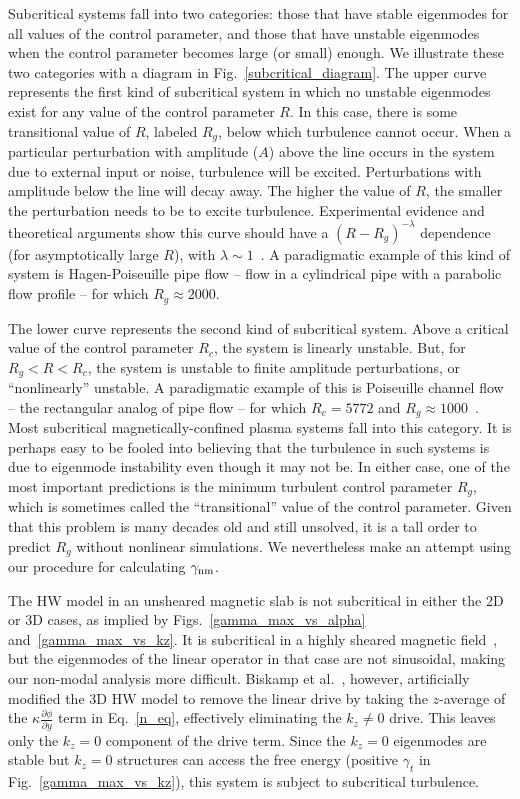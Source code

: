 \documentclass[twocolumn,showkeys,superscriptaddress]{revtex4}
\newcommand{\pdiff}[2]{\frac{\partial#1}{\partial#2}}
\begin{document}
Subcritical systems fall into two categories: those that have stable eigenmodes for all values of the control parameter, and those that have unstable eigenmodes
when the control parameter becomes large (or small) enough. We illustrate these two categories with a diagram in Fig.~\ref{subcritical_diagram}. 
The upper curve represents the first kind of subcritical system in which no unstable eigenmodes exist for any value of the control parameter $R$. In this
case, there is some transitional value of $R$, labeled $R_g$, below
which turbulence cannot occur. When a particular perturbation with amplitude ($A$) above the line occurs in the system due to external input or noise, turbulence will be excited. 
Perturbations with amplitude below the line will decay away. The higher the value of $R$, the smaller the perturbation needs to be to excite turbulence.
Experimental evidence and theoretical arguments show this curve should have a $(R-R_g)^{-\lambda}$ dependence (for asymptotically large $R$), with $\lambda \sim 1$~\cite{waleffe1995b,grossmann2000,hof2003}.
A paradigmatic example of this kind of system is Hagen-Poiseuille pipe flow -- flow in a cylindrical pipe with a parabolic flow profile -- for which $R_g \approx 2000$.

The lower curve represents the second kind of subcritical system. Above a critical value of the control parameter $R_c$, the system is linearly unstable. But, for $R_g < R < R_c$, the system is
unstable to finite amplitude perturbations, or ``nonlinearly'' unstable. A paradigmatic example of this is Poiseuille channel flow -- the rectangular analog of pipe flow -- for which
$R_c = 5772$ and $R_g \approx 1000$~\cite{grossmann2000}. Most subcritical magnetically-confined plasma systems fall into this category. It is perhaps easy to be fooled into believing that the turbulence
in such systems is due to eigenmode instability even though it may not be. 
In either case, one of the most important predictions is the minimum turbulent control parameter $R_g$, which is sometimes called the ``transitional'' value of the control parameter. Given that this problem is many decades old
and still unsolved, it is a tall order to predict $R_g$ without nonlinear simulations. We nevertheless make an attempt using our procedure for calculating $\gamma_{\rm{nm}}$.

The HW model in an unsheared magnetic slab is not subcritical in either the 2D or 3D cases, as implied by Figs.~\ref{gamma_max_vs_alpha} and~\ref{gamma_max_vs_kz}. It is subcritical in a highly sheared
magnetic field~\cite{drake1995}, but the eigenmodes of the linear operator in that case are not sinusoidal, making our non-modal analysis more difficult. 
Biskamp et al.~\cite{biskamp1995}, however, artificially modified the
3D HW model to remove the linear drive by taking the $z$-average of the $\kappa \pdiff{\phi}{y}$ term in Eq.~\ref{n_eq}, effectively eliminating the $k_z \ne 0$ drive. This leaves only the $k_z = 0$
component of the drive term. Since the $k_z = 0$ eigenmodes are stable but $k_z = 0$ structures can access the free energy (positive $\gamma_t$ in Fig.~\ref{gamma_max_vs_kz}), this system is subject
to subcritical turbulence.
\end{document}
